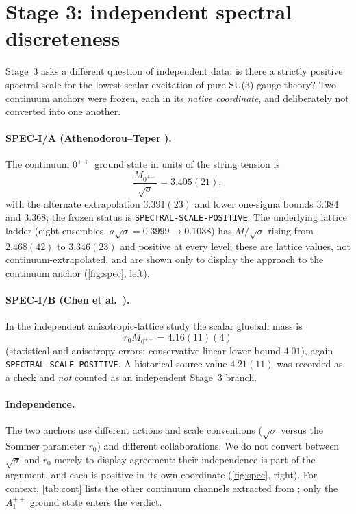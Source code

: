 \documentclass[11pt,a4paper]{article}
\theoremstyle{definition}
\theoremstyle{remark}
\newcommand{\sqs}{\sqrt{\sigma}}
\begin{document}
\section{Stage 3: independent spectral discreteness}\label{sec:stage3}

Stage~3 asks a different question of independent data: is there a strictly positive spectral scale for the lowest scalar excitation of pure SU(3) gauge theory? Two continuum anchors were frozen, each in its \emph{native coordinate}, and deliberately not converted into one another.

\paragraph{SPEC-I/A (Athenodorou--Teper \cite{AT20}).} The continuum $0^{++}$ ground state in units of the string tension is
\begin{equation}
\frac{M_{0^{++}}}{\sqs}=3.405(21),
\end{equation}
with the alternate extrapolation $3.391(23)$ and lower one-sigma bounds $3.384$ and $3.368$; the frozen status is \texttt{SPECTRAL-\allowbreak{}SCALE-\allowbreak{}POSITIVE}. The underlying lattice ladder (eight ensembles, $a\sqs=0.3999\to0.1038$) has $M/\sqs$ rising from $2.468(42)$ to $3.346(23)$ and positive at every level; these are lattice values, not continuum-extrapolated, and are shown only to display the approach to the continuum anchor (\cref{fig:spec}, left).

\paragraph{SPEC-I/B (Chen et al.\ \cite{Chen06}).} In the independent anisotropic-lattice study the scalar glueball mass is
\begin{equation}
r_0 M_{0^{++}}=4.16(11)(4)
\end{equation}
(statistical and anisotropy errors; conservative linear lower bound $4.01$), again \texttt{SPECTRAL-\allowbreak{}SCALE-\allowbreak{}POSITIVE}. A historical source value $4.21(11)$ was recorded as a check and \emph{not} counted as an independent Stage~3 branch.

\paragraph{Independence.} The two anchors use different actions and scale conventions ($\sqs$ versus the Sommer parameter $r_0$) and different collaborations. We do not convert between $\sqs$ and $r_0$ merely to display agreement: their independence is part of the argument, and each is positive in its own coordinate (\cref{fig:spec}, right). For context, \cref{tab:cont} lists the other continuum channels extracted from \cite{AT20}; only the $A_1^{++}$ ground state enters the verdict.
\end{document}
